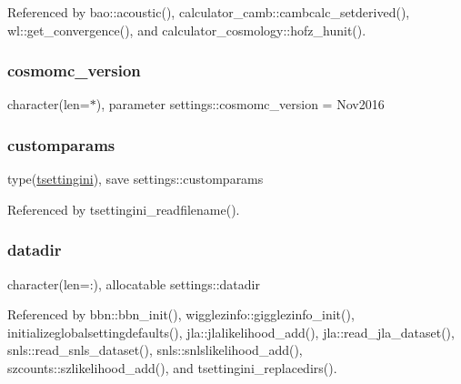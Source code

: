 Referenced by bao\+::acoustic(), calculator\+\_\+camb\+::cambcalc\+\_\+setderived(), wl\+::get\+\_\+convergence(), and calculator\+\_\+cosmology\+::hofz\+\_\+hunit().

\mbox{\label{namespacesettings_a572023d0201bee3f5560de0fdc96dc4e}} 
\subsubsection{\texorpdfstring{cosmomc\+\_\+version}{cosmomc\_version}}
{\footnotesize\ttfamily character(len=$\ast$), parameter settings\+::cosmomc\+\_\+version = \textquotesingle{}Nov2016\textquotesingle{}}

\mbox{\label{namespacesettings_a7f5934d4eca8e396a1c744c7fa88bcba}} 
\subsubsection{\texorpdfstring{customparams}{customparams}}
{\footnotesize\ttfamily type(\mbox{\hyperlink{structsettings_1_1tsettingini}{tsettingini}}), save settings\+::customparams}



Referenced by tsettingini\+\_\+readfilename().

\mbox{\label{namespacesettings_a2deacc581b6841445fd044dab25ef389}} 
\subsubsection{\texorpdfstring{datadir}{datadir}}
{\footnotesize\ttfamily character(len=\+:), allocatable settings\+::datadir}



Referenced by bbn\+::bbn\+\_\+init(), wigglezinfo\+::gigglezinfo\+\_\+init(), initializeglobalsettingdefaults(), jla\+::jlalikelihood\+\_\+add(), jla\+::read\+\_\+jla\+\_\+dataset(), snls\+::read\+\_\+snls\+\_\+dataset(), snls\+::snlslikelihood\+\_\+add(), szcounts\+::szlikelihood\+\_\+add(), and tsettingini\+\_\+replacedirs().

